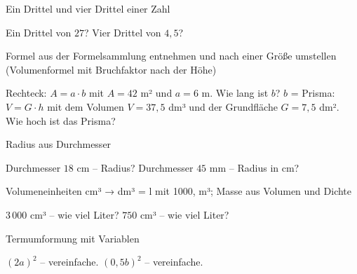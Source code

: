 \begin{aufgabe}{Ein Drittel und vier Drittel einer Zahl}
\begin{teile}
\teil Ein Drittel von $27$? \leerfeld
\teil Vier Drittel von $4{,}5$? \leerfeld
\end{teile}
\end{aufgabe}

\begin{aufgabe}{Formel aus der Formelsammlung entnehmen und nach einer Größe umstellen (Volumenformel mit Bruchfaktor nach der Höhe)}
\begin{teile}
\teil Rechteck: $A = a \cdot b$ mit $A = 42$ m² und $a = 6$ m. Wie lang ist $b$? $b$ = \leerfeld[m]
\teil Prisma: $V = G \cdot h$ mit dem Volumen $V = 37{,}5$ dm³ und der Grundfläche $G = 7{,}5$ dm². Wie hoch ist das Prisma? \leerfeld[dm]
\end{teile}
\end{aufgabe}

\begin{aufgabe}{Radius aus Durchmesser}
\begin{teile}
\teil Durchmesser $18$ cm – Radius? \leerfeld[cm]
\teil Durchmesser $45$ mm – Radius in cm? \leerfeld[cm]
\end{teile}
\end{aufgabe}

\begin{aufgabe}{Volumeneinheiten cm³ → dm³ = l mit 1000, m³; Masse aus Volumen und Dichte}
\begin{teile}
\teil $3\,000$ cm³ – wie viel Liter? \leerfeld[l]
\teil $750$ cm³ – wie viel Liter? \leerfeld[l]
\end{teile}
\end{aufgabe}

\begin{aufgabe}{Termumformung mit Variablen}
\begin{teile}
\teil $(2a)^2$ – vereinfache. \leerfeld
\teil $(0{,}5b)^2$ – vereinfache. \leerfeld
\end{teile}
\end{aufgabe}

